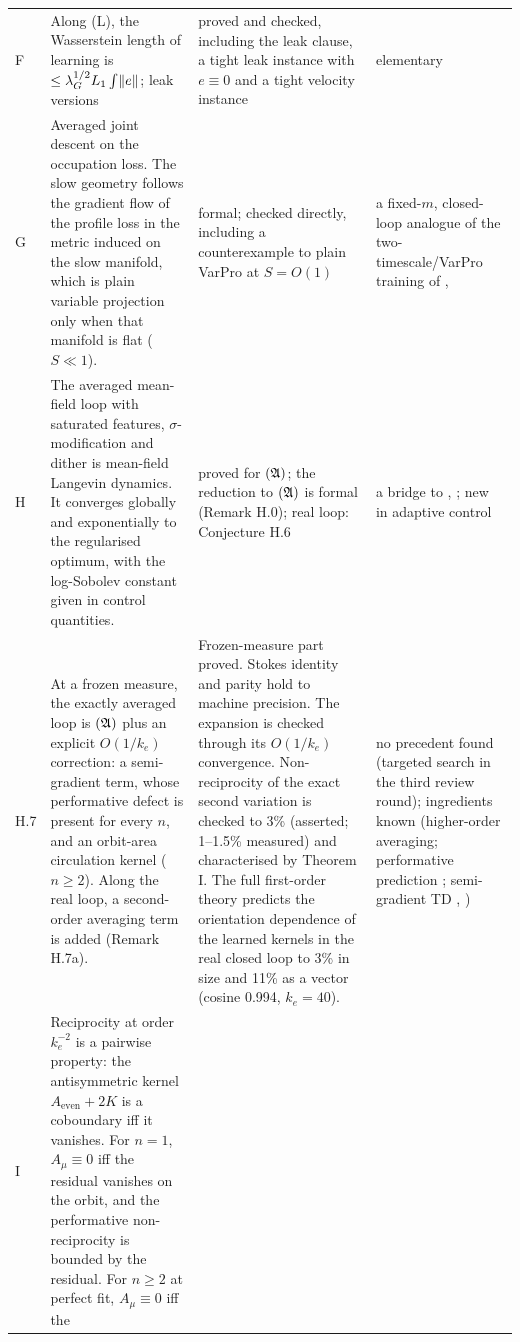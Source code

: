 {\begin{longtable}{@{}>{\raggedright\arraybackslash}p{}>{\raggedright\arraybackslash}p{}%
>{\raggedright\arraybackslash}p{}>{\raggedright\arraybackslash}p{}@{}}
\addlinespace[0.5pt]
F & Along (L), the Wasserstein length of learning is $\le \lambda_G^{1/2}L_1\int\lVert e\rVert$; leak versions
& proved and checked, including the leak clause, a tight leak instance with $e \equiv 0$ and a tight velocity
instance
& elementary\\
\addlinespace[0.5pt]
G & Averaged joint descent on the occupation loss. The slow geometry follows the gradient flow of the profile loss
in the metric induced on the slow manifold, which is plain variable projection only when that manifold is flat
($S \ll 1$).
& formal; checked directly, including a counterexample to plain VarPro at $S = O(1)$
& a fixed-$m$, closed-loop analogue of the two-timescale/VarPro training of \cite{S1}, \cite{S2}\\
\addlinespace[0.5pt]
H & The averaged mean-field loop with saturated features, $\sigma$-modification and dither is mean-field Langevin
dynamics. It converges globally and exponentially to the regularised optimum, with the log-Sobolev constant given in
control quantities.
& proved for $(\mathfrak{A})$; the reduction to $(\mathfrak{A})$ is formal (Remark H.0); real loop: Conjecture H.6
& a bridge to \cite{S3}, \cite{S4}; new in adaptive control\\
\addlinespace[0.5pt]
H.7 & At a frozen measure, the exactly averaged loop is $(\mathfrak{A})$ plus an explicit $O(1/k_e)$ correction: a
semi-gradient term, whose performative defect is present for every $n$, and an orbit-area circulation kernel
($n \ge 2$). Along the real loop, a second-order averaging term is added (Remark H.7a).
& Frozen-measure part proved. Stokes identity and parity hold to machine precision. The expansion is checked through
its $O(1/k_e)$ convergence. Non-reciprocity of the exact second variation is checked to 3\% (asserted; 1--1.5\%
measured) and characterised by Theorem I. The full first-order theory predicts the orientation dependence of the
learned kernels in the real closed loop to 3\% in size and 11\% as a vector (cosine 0.994, $k_e = 40$).
& no precedent found (targeted search in the third review round); ingredients known (higher-order averaging;
performative prediction \cite{S14}; semi-gradient TD \cite{S10}, \cite{S11})\\
\addlinespace[0.5pt]
I & Reciprocity at order $k_e^{-2}$ is a pairwise property: the antisymmetric kernel $A_{\mathrm{even}} + 2K$ is a
coboundary iff it vanishes. For $n = 1$, $A_\mu \equiv 0$ iff the residual vanishes on the orbit, and the
performative non-reciprocity is bounded by the residual. For $n \ge 2$ at perfect fit, $A_\mu \equiv 0$ iff the

\end{longtable}}
